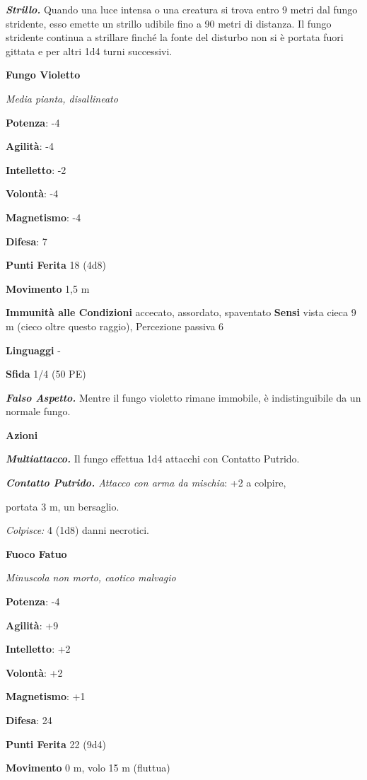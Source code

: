 \begin{multicols}{2}
\emph{\textbf{Strillo.}} Quando una luce intensa o una creatura si trova
entro 9 metri dal fungo stridente, esso emette un strillo udibile fino a
90 metri di distanza. Il fungo stridente continua a strillare finché la
fonte del disturbo non si è portata fuori gittata e per altri 1d4 turni
successivi.

\textbf{Fungo Violetto}

\emph{Media pianta, disallineato}

\textbf{Potenza}: -4

\textbf{Agilità}: -4

\textbf{Intelletto}: -2

\textbf{Volontà}: -4

\textbf{Magnetismo}: -4

\textbf{Difesa}: 7

\textbf{Punti Ferita} 18 (4d8)

\textbf{Movimento} 1,5 m

\textbf{Immunità alle Condizioni} accecato, assordato, spaventato
\textbf{Sensi} vista cieca 9 m (cieco oltre questo raggio), Percezione
passiva 6

\textbf{Linguaggi} -

\textbf{Sfida} 1/4 (50 PE)

\emph{\textbf{Falso Aspetto.}} Mentre il fungo violetto rimane immobile,
è indistinguibile da un normale fungo.

\textbf{Azioni}

\emph{\textbf{Multiattacco.}} Il fungo effettua 1d4 attacchi con
Contatto Putrido.

\emph{\textbf{Contatto Putrido.} Attacco con arma da mischia}: +2 a
colpire,

portata 3 m, un bersaglio.

\emph{Colpisce:} 4 (1d8) danni necrotici.

\textbf{Fuoco Fatuo}

\emph{Minuscola non morto, caotico malvagio}

\textbf{Potenza}: -4

\textbf{Agilità}: +9

\textbf{Intelletto}: +2

\textbf{Volontà}: +2

\textbf{Magnetismo}: +1

\textbf{Difesa}: 24

\textbf{Punti Ferita} 22 (9d4)

\textbf{Movimento} 0 m, volo 15 m (fluttua)


\end{multicols}
